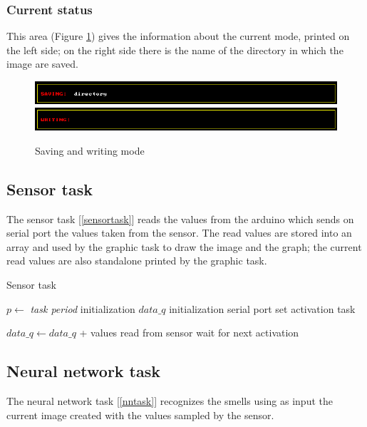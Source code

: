 \documentclass[12pt]{article}
\begin{document}
\subsubsection*{Current status}
This area (Figure \ref{save_write}) gives the information about the current
mode, printed on the left side; on the right side there is the name of the
directory in which the image are saved.

\begin{figure}[H]
    \centering
    \includegraphics[scale=0.75]{images/saving.png}
    \includegraphics[scale=0.75]{images/writing.png}
    \caption{Saving and writing mode}
    \label{save_write}
\end{figure}

\subsection{Sensor task}
The sensor task [\ref{sensortask}] reads the values from the arduino which
sends on serial port the values taken from the sensor. The read values are
stored into an array and used by the graphic task to draw the image and the
graph; the current read values are also standalone printed by the graphic
task.

\begin{algorithm}[H]
\caption{Sensor task}
\label{sensortask}

\begin{algorithmic}
\State $p\gets$ \textit{task period}
\State initialization $data\_q$
\State initialization serial port
\State set activation task

\Loop
\State $data\_q\gets data\_q$ + values read from sensor
\State wait for next activation
\EndLoop

\end{algorithmic}
\end{algorithm}

\subsection{Neural network task}
The neural network task [\ref{nntask}] recognizes the smells using as input the
current image created with the values sampled by the sensor.
\end{document}
